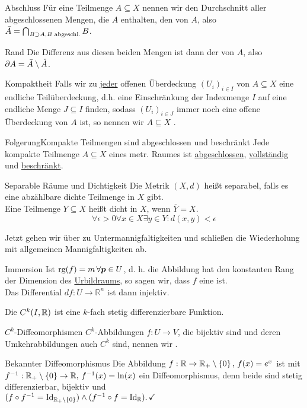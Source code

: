 \begin{Def}
{Abschluss}
Für eine Teilmenge $A\subseteq X$ nennen wir den Durchschnitt aller abgeschlossenen Mengen, die $A$ enthalten, den  von $A$, also $\Bar{A}=\bigcap_{B\supset A, B\text{ abgeschl.}}B$.
\end{Def}
\begin{Def}
{Rand}
Die Differenz aus diesen beiden Mengen ist dann der  von $A$, also $\partial A=\Bar{A}\setminus \mathring{A}$.
\end{Def}
\begin{Def}
{Kompaktheit}
Falls wir zu \underline{jeder} offenen Überdeckung $(U_i)_{i\in I}$ von $A\subseteq X$ eine endliche Teilüberdeckung, d.h. eine Einschränkung der Indexmenge $I$ auf eine endliche Menge $J\subseteq I$ finden, sodass $(U_i)_{i\in J}$ immer noch eine offene Überdeckung von $A$ ist, so nennen wir $A\subseteq X$ .
\end{Def}
\begin{Satz}
{Folgerung}{Kompakte Teilmengen sind abgeschlossen und beschränkt}
Jede kompakte Teilmenge $A\subseteq X$ eines metr. Raumes ist \underline{abgeschlossen}, \underline{vollständig} und \underline{beschränkt}.
\end{Satz}
\begin{Def}{Separable Räume und Dichtigkeit}
    Die Metrik $(X,d)$ heißt separabel, falls es eine abzählbare dichte Teilmenge in $X$ gibt. \\
    Eine Teilmenge $Y\subseteq X$ heißt dicht in $X$, wenn $\overline{Y}=X$.
    $$\forall \epsilon>0 \forall x\in X \exists y\in Y: d(x,y) <\epsilon$$
\end{Def}
Jetzt gehen wir über zu Untermannigfaltigkeiten und schließen die Wiederholung mit allgemeinen Mannigfaltigkeiten ab.
\begin{Def}
{Immersion}
Ist $\text{rg}(f)=m\,\forall {{\text{\boldmath${p}$}}}\in U$, d. h. die Abbildung hat den konstanten Rang der Dimension des \underline{Urbildraums}, so sagen wir, dass $f$ eine  ist.\\
Das Differential $df:U\to\mathbb{R}^n$ ist dann injektiv. 
\end{Def}
Die $C^k(I,\mathbb{R})$ ist eine $k$-fach stetig differenzierbare Funktion.
\begin{Def}
{$C^k$-Diffeomorphismen}
$C^k$-Abbildungen $f:U\to V$, die bijektiv sind und deren Umkehrabbildungen auch $C^k$ sind, nennen wir .
\end{Def}
\begin{Beispiel}
{Bekannter Diffeomorphismus}
Die Abbildung $f:\mathbb{R}\to\mathbb{R}_+\setminus\left\{0\right\},\,f(x)=e^x$ ist mit $f^{-1}:\mathbb{R}_+\setminus\left\{0\right\}\to\mathbb{R},\,f^{-1}(x)=\ln(x)$ ein Diffeomorphismus, denn beide sind stetig differenzierbar, bijektiv und\\
$(f\circ f^{-1}=\text{Id}_{\mathbb{R}_+\setminus\left\{0\right\}})\land (f^{-1}\circ f=\text{Id}_\mathbb{R}).\,\checkmark$
\end{Beispiel}
